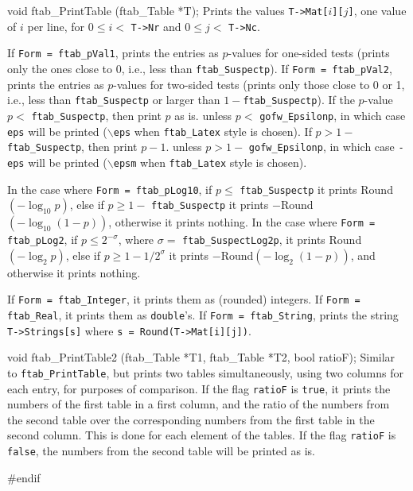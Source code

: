 void ftab_PrintTable (ftab_Table *T);
\endcode
 \tab
  Prints the values {\tt T->Mat[$i$][$j$]}, one value of $i$ per line,
  for $0 \le i < ${ \tt T->Nr} and $0 \le j < ${ \tt T->Nc}.

  If {\tt Form = ftab\_pVal1}, prints the entries as $p$-values for
  one-sided tests (prints only the ones close to 0, i.e., less than
  {\tt ftab\_Suspectp}).
  If {\tt Form = ftab\_pVal2}, prints the entries as $p$-values for
  two-sided tests (prints only those close to 0 or 1, i.e.,
  less than {\tt ftab\_Suspectp} or larger than $1 - {}${\tt ftab\_Suspectp}).
  If the $p$-value $p <$ {\tt ftab\_Suspectp}, then print $p$ as is.
  unless $p <$ {\tt gofw\_Epsilonp}, in which case {\tt eps} will be printed
   ({\tt $\backslash$eps} when {\tt ftab\_Latex} style is chosen).
  If $p > 1 - {}${\tt ftab\_Suspectp}, then print $p-1$.
  unless $p > 1 - {}$ {\tt gofw\_Epsilonp}, in which case {\tt -eps} will be
   printed ({\tt $\backslash$epsm} when {\tt ftab\_Latex} style is chosen).

  In the case where {\tt Form = ftab\_pLog10},
  if $p \le $ {\tt ftab\_Suspectp} it prints  Round$(- \log_{10} p)$,
  else if $p \ge 1 - $ {\tt ftab\_Suspectp} it prints
  $-$Round$(- \log_{10} (1-p))$, otherwise it prints nothing.
  In the case where {\tt Form = ftab\_pLog2},
  if $p \le 2^{-\sigma}$, where $\sigma =$ {\tt ftab\_SuspectLog2p},
  it prints {\rm Round$( - \log_2 p)$}, else if $p \ge 1 - 1/2^\sigma$
  it prints $-${\rm  Round$(- \log_2 (1-p))$}, and otherwise it prints
  nothing.

  If {\tt Form = ftab\_Integer}, it prints them as (rounded) integers.
  If {\tt Form = ftab\_Real}, it prints them as {\tt double}'s.
  If {\tt Form = ftab\_String},  prints  the string
  {\tt  T->Strings[s]} where {\tt s = {\rm Round}(T->Mat[i][j])}.

 \endtab
\code


void ftab_PrintTable2 (ftab_Table *T1, ftab_Table *T2, bool ratioF);
\endcode
 \tab
  Similar to {\tt ftab\_PrintTable}, but prints two tables simultaneously,
  using two columns for each entry, for purposes of comparison.
  If the flag {\tt ratioF} is {\tt true}, it prints the numbers of the
  first table in a first column, and the ratio of the numbers from the
  second table over the corresponding numbers from the first table in the
  second column. This is done for each element of the tables.
  If the flag {\tt ratioF} is {\tt false}, the numbers from the second
  table will be printed as is.
 \endtab
\code

\hide
#endif
\endhide
\endcode
